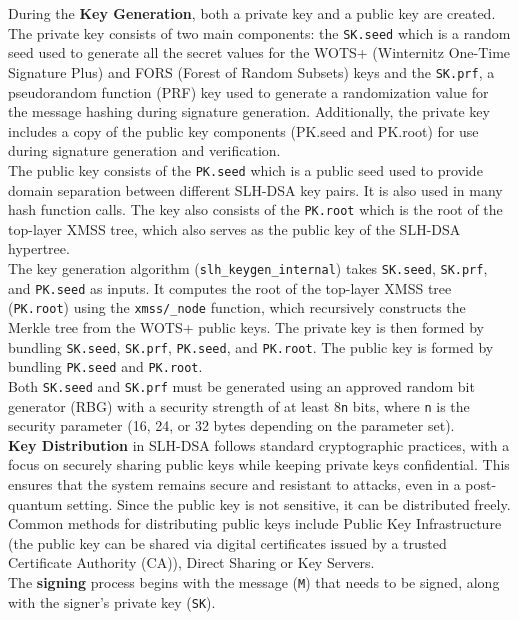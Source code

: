 \documentclass[journal=tosc,notanonymous]{iacrtrans}
\begin{document}
During the \textbf{Key Generation}, both a private key and a public key are created. The private key consists of two main components:
the \texttt{SK.seed} which is a random seed used to generate all the secret values for the WOTS+ (Winternitz One-Time Signature Plus) and FORS (Forest of Random Subsets) keys and the \texttt{SK.prf}, a pseudorandom function (PRF) key used to generate a randomization value for the message hashing during signature generation.
Additionally, the private key includes a copy of the public key components (PK.seed and PK.root) for use during signature generation and verification.
\\
The public key consists of the \texttt{PK.seed} which is a public seed used to provide domain separation between different SLH-DSA key pairs. It is also used in many hash function calls. The key also consists of the \texttt{PK.root} which is the root of the top-layer XMSS tree, which also serves as the public key of the SLH-DSA hypertree.
\\
The key generation algorithm (\verb|slh_keygen_internal|) takes \texttt{SK.seed}, \texttt{SK.prf}, and \texttt{PK.seed} as inputs.
It computes the root of the top-layer XMSS tree (\texttt{PK.root}) using the \verb|xmss/_node| function, which recursively constructs the Merkle tree from the WOTS+ public keys.
The private key is then formed by bundling \texttt{SK.seed}, \texttt{SK.prf}, \texttt{PK.seed}, and \texttt{PK.root}.
The public key is formed by bundling \texttt{PK.seed} and \texttt{PK.root}.
\\
Both \texttt{SK.seed} and \texttt{SK.prf} must be generated using an approved random bit generator (RBG) with a security strength of at least 8\texttt{n} bits, where \texttt{n} is the security parameter (16, 24, or 32 bytes depending on the parameter set).\\
\newline
\textbf{Key Distribution} in SLH-DSA follows standard cryptographic practices, with a focus on securely sharing public keys while keeping private keys confidential. This ensures that the system remains secure and resistant to attacks, even in a post-quantum setting. Since the public key is not sensitive, it can be distributed freely. Common methods for distributing public keys include Public Key Infrastructure (the public key can be shared via digital certificates issued by a trusted Certificate Authority (CA)), Direct Sharing or Key Servers.\\
\newline
The \textbf{signing} process begins with the message (\texttt{M}) that needs to be signed, along with the signer's private key (\texttt{SK}). 
\end{document}

